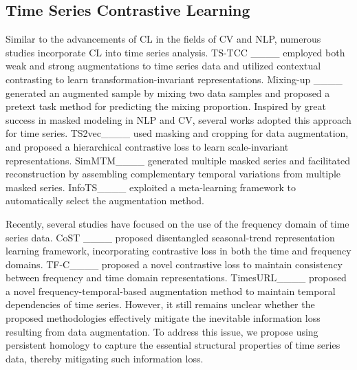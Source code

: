 \subsection{Time Series Contrastive Learning} 
Similar to the advancements of CL in the fields of CV and NLP, numerous studies incorporate CL into time series analysis. TS-TCC ____ employed both weak and strong augmentations to time series data and utilized contextual contrasting to learn transformation-invariant representations. Mixing-up ____ generated an augmented sample by mixing two data samples and proposed a pretext task method for predicting the mixing proportion. Inspired by great success in masked modeling in NLP and CV, several works adopted this approach for time series. TS2vec____ used masking and cropping for data augmentation, and proposed a hierarchical contrastive loss to learn scale-invariant representations. SimMTM____ generated multiple masked series and facilitated reconstruction by assembling complementary temporal variations from multiple masked series. InfoTS____ exploited a meta-learning framework to automatically select the augmentation method.

Recently, several studies have focused on the use of the frequency domain of time series data. CoST ____ proposed disentangled seasonal-trend representation learning framework, incorporating contrastive loss in both the time and frequency domains. TF-C____ proposed a novel contrastive loss to maintain consistency between frequency and time domain representations. TimesURL____ proposed a novel frequency-temporal-based augmentation method to maintain temporal dependencies of time series. However, it still remains unclear whether the proposed methodologies effectively mitigate the inevitable information loss resulting from data augmentation. To address this issue, we propose using persistent homology to capture the essential structural properties of time series data, thereby mitigating such information loss.
